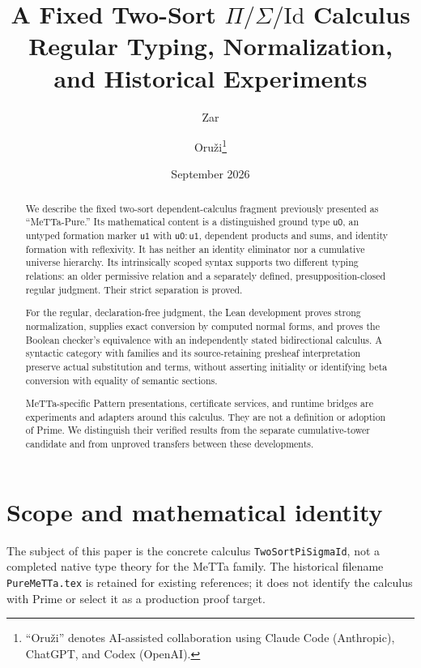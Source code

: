 \documentclass[11pt]{article}
\title{A Fixed Two-Sort $\Pi/\Sigma/\mathrm{Id}$ Calculus\\
\large Regular Typing, Normalization, and Historical \MeTTa{} Experiments}
\author{Zar \and Oru\v{z}i\footnote{“Oru\v{z}i” denotes AI-assisted
collaboration using Claude Code (Anthropic), ChatGPT, and Codex (OpenAI).}}
\date{September 2026}
\newcommand{\code}[1]{\nolinkurl{#1}}
\newcommand{\uZ}{\mathsf{u0}}
\newcommand{\uO}{\mathsf{u1}}
\begin{document}
\maketitle

\begin{abstract}
We describe the fixed two-sort dependent-calculus fragment previously
presented as “MeTTa-Pure.” Its mathematical content is
a distinguished ground type $\uZ$, an untyped formation marker $\uO$ with
$\uZ:\uO$, dependent products and sums, and identity formation with
reflexivity. It has neither an identity eliminator nor a cumulative universe
hierarchy. Its intrinsically scoped syntax supports two different typing
relations: an older permissive relation and a separately defined,
presupposition-closed regular judgment. Their strict separation is proved.

For the regular, declaration-free judgment, the Lean development proves
strong normalization, supplies exact conversion by computed normal forms,
and proves the Boolean checker's equivalence with an independently stated
bidirectional calculus. A syntactic category with families and its
source-retaining presheaf interpretation preserve actual substitution and
terms, without asserting initiality or identifying beta conversion with
equality of semantic sections.

MeTTa-specific Pattern presentations, certificate services, and runtime
bridges are experiments and adapters around this calculus. They are not a
definition or adoption of Prime. We distinguish their verified results from
the separate cumulative-tower candidate and from unproved transfers between
these developments.
\end{abstract}

\tableofcontents

\section{Scope and mathematical identity}

The subject of this paper is the concrete calculus
\code{TwoSortPiSigmaId}, not a completed native type theory for the MeTTa
family. The historical filename \code{PureMeTTa.tex} is retained for existing
references; it does not identify the calculus with Prime or select it as a
production proof target.
\end{document}
